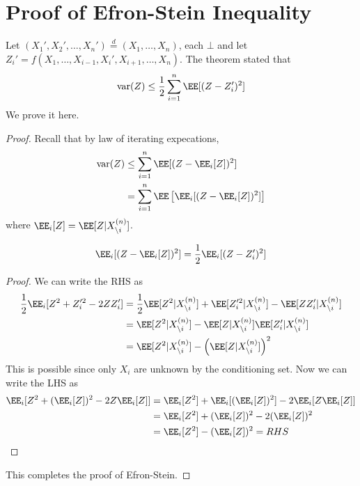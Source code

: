 \section{Proof of Efron-Stein Inequality}
Let $(X_1', X_2', \dots, X_n') \stackrel{d}{=} (X_1, \dots, X_n)$, each $\bot$ and let $Z_i' = f(X_1, \dots, X_{i-1}, X_i', X_{i+1}, \dots, X_n)$. The theorem stated that 
\[
\text{var}(Z) \leq \frac{1}{2} \sum_{i=1}^n \EE[(Z - Z_i')^2]
\]
We prove it here.
\begin{proof}
Recall that by law of iterating expecations,
\begin{align*}
    \text{var}(Z) &\leq \sum_{i=1}^n \EE[(Z - \EE_i[Z])^2] \\
    &= \sum_{i=1}^n \EE\left[\EE_i[(Z- \EE_i[Z])^2]\right]
\end{align*}
where $\EE_i[Z] = \EE[Z | X_{\setminus i}^{(n)}]$.
\begin{prop}
\[
\EE_i[(Z - \EE_i[Z])^2] = \frac{1}{2} \EE_i[(Z - Z_i')^2]
\]
\end{prop}
\begin{proof}
We can write the RHS as
\begin{align*}
    \frac{1}{2} \EE_i[Z^2 + Z_i'^2 - 2 Z Z_i'] &= \frac{1}{2} \EE[Z^2 | X_{\setminus i}^{(n)} ] + \EE[Z_i'^2 | X_{\setminus i}^{(n)}] - \EE[Z Z_i' | X_{\setminus i}^{(n)}] \\
    &= \EE[Z^2 | X_{\setminus i}^{(n)}] - \EE[Z|X_{\setminus i}^{(n)}]\EE[Z_i'|X_{\setminus i}^{(n)}] \\
    &= \EE[Z^2 | X_{\setminus i}^{(n)}] - \left(\EE[Z|X_{\setminus i}^{(n)}]\right)^2
\end{align*}
This is possible since only $X_i$ are unknown by the conditioning set.
Now we can write the LHS as
\begin{align*}
    \EE_i[Z^2 + (\EE_i[Z])^2 - 2Z\EE_i[Z]] &= \EE_i[Z^2] + \EE_i[(\EE_i[Z])^2] - 2\EE_i[Z\EE_i[Z]] \\
    &= \EE_i[Z^2] + (\EE_i[Z])^2 - 2(\EE_i[Z])^2 \\
    &= \EE_i[Z^2] - (\EE_i[Z])^2 = RHS
\end{align*}
\end{proof}
This completes the proof of Efron-Stein.
\end{proof}
